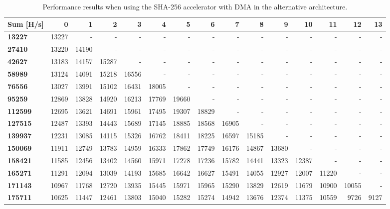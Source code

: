\begin{appendix}
\begin{sidewaystable}
\centering
\begin{tabular}{| l || r r r r r r r r r r r r r r |}
  \hline 
  \textbf{Sum} [H/s] & \textbf{0} & \textbf{1} & \textbf{2} & \textbf{3} & \textbf{4} & \textbf{5} & \textbf{6} & \textbf{7} & \textbf{8} & \textbf{9} & \textbf{10} & \textbf{11} & \textbf{12} & \textbf{13}\\
  \hline                       
  \textbf{13227} & 13227 & - & - & - & - & - & - & - & - & - & - & - & - & -\\
  \textbf{27410} & 13220 & 14190 & - & - & - & - & - & - & - & - & - & - & - & -\\
  \textbf{42627} & 13183 & 14157 & 15287 & - & - & - & - & - & - & - & - & - & - & -\\
  \textbf{58989} & 13124 & 14091 & 15218 & 16556 & - & - & - & - & - & - & - & - & - & -\\
  \textbf{76556} & 13027 & 13991 & 15102 & 16431 & 18005 & - & - & - & - & - & - & - & - & -\\
  \textbf{95259} & 12869 & 13828 & 14920 & 16213 & 17769 & 19660 & - & - & - & - & - & - & - & -\\
  \textbf{112599} & 12695 & 13621 & 14691 & 15961 & 17495 & 19307 & 18829 & - & - & - & - & - & - & -\\
  \textbf{127515} & 12487 & 13393 & 14443 & 15689 & 17145 & 18885 & 18568 & 16905 & - & - & - & - & - & -\\
  \textbf{139937} & 12231 & 13085 & 14115 & 15326 & 16762 & 18411 & 18225 & 16597 & 15185 & - & - & - & - & -\\
  \textbf{150069} & 11911 & 12749 & 13783 & 14959 & 16333 & 17862 & 17749 & 16176 & 14867 & 13680 & - & - & - & -\\
  \textbf{158421} & 11585 & 12456 & 13402 & 14560 & 15971 & 17278 & 17236 & 15782 & 14441 & 13323 & 12387 & - & - & -\\
  \textbf{165271} & 11291 & 12094 & 13039 & 14193 & 15685 & 16642 & 16627 & 15491 & 14055 & 12927 & 12007 & 11220 & - & -\\
  \textbf{171143} & 10967 & 11768 & 12720 & 13935 & 15445 & 15971 & 15965 & 15290 & 13829 & 12619 & 11679 & 10900 & 10055 & -\\
  \textbf{175711} & 10625 & 11447 & 12461 & 13803 & 15040 & 15282 & 15274 & 14942 & 13676 & 12374 & 11375 & 10559 & 9726 & 9127\\
  \hline  
\end{tabular}
\caption{Performance results when using the SHA-256 accelerator with DMA in the alternative architecture.}
\label{tab:Perf-SHADMA2}
\end{sidewaystable}


\end{appendix}
